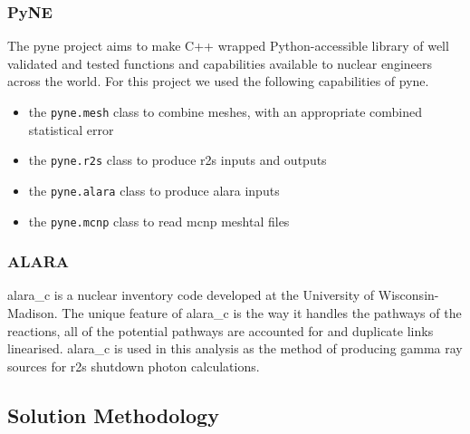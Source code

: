 \documentclass[12pt]{article}
\begin{document}
\subsubsection{PyNE}
The \gls{pyne} \cite{Scopatz2012b} project aims to
make C++ wrapped Python-accessible library of well validated and tested
functions and capabilities available to nuclear engineers across the world.
For this project we used the following capabilities of \gls{pyne}.
\begin{itemize}
  \item{the \texttt{pyne.mesh} class to combine meshes, with an appropriate
        combined statistical error}
  \item{the \texttt{pyne.r2s} class to produce \gls{r2s} inputs and outputs}
  \item{the \texttt{pyne.alara} class to produce alara inputs}
  \item{the \texttt{pyne.mcnp} class to read \gls{mcnp} meshtal files}
\end{itemize}
\subsubsection{ALARA}
\gls{alara_c} \cite{alara} is a nuclear inventory code developed at the University of
Wisconsin-Madison. The unique feature of \gls{alara_c} is the way it handles the
pathways of the reactions, all of the potential pathways are accounted for and
duplicate links linearised. \gls{alara_c} is used in this analysis as the method of
producing gamma ray sources for \gls{r2s} shutdown photon calculations.
\newpage
\subsection{Solution Methodology}
\end{document}
